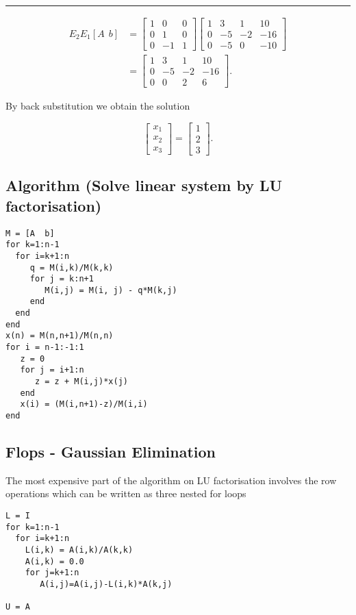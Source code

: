 \documentclass[11pt]{article}
\begin{document}
\begin{center}\rule{0.5\linewidth}{\linethickness}\end{center}

\[\begin{aligned}
E_2 E_1 [A \ \ b] & = \left[\begin{array}{rrrr}
1 & 0 & 0\\
0 & 1 & 0 \\
0 & -1 & 1
\end{array}\right] \left[\begin{array}{rrrr}
1  &  3  & 1 & 10\\
0  & -5  & -2 & -16\\
0  & -5  & 0  &  -10
\end{array}\right]\\
&= \left[\begin{array}{rrrr}
1  &  3  & 1 & 10\\
0  & -5  & -2 & -16\\
0  & 0  &  2 & 6
\end{array}\right].\end{aligned}\]

By back substitution we obtain the solution

\[\begin{bmatrix} x_1\\x_2\\x_3 \end{bmatrix} = \begin{bmatrix} 1\\2\\3 \end{bmatrix}.\]

\subsection{Algorithm (Solve linear system by LU
factorisation)}\label{algorithm-solve-linear-system-by-lu-factorisation}

\begin{verbatim}
M = [A  b]
for k=1:n-1
  for i=k+1:n
     q = M(i,k)/M(k,k)
     for j = k:n+1
        M(i,j) = M(i, j) - q*M(k,j)
     end
  end
end
x(n) = M(n,n+1)/M(n,n)
for i = n-1:-1:1
   z = 0
   for j = i+1:n
      z = z + M(i,j)*x(j)
   end
   x(i) = (M(i,n+1)-z)/M(i,i)
end
\end{verbatim}

\subsection{Flops - Gaussian
Elimination}\label{flops---gaussian-elimination}

The most expensive part of the algorithm on LU factorisation involves
the row operations which can be written as three nested for loops

\begin{verbatim}
L = I
for k=1:n-1
  for i=k+1:n
    L(i,k) = A(i,k)/A(k,k)
    A(i,k) = 0.0
    for j=k+1:n
       A(i,j)=A(i,j)-L(i,k)*A(k,j)

U = A
\end{verbatim}


    
    
    
    
\end{document}
